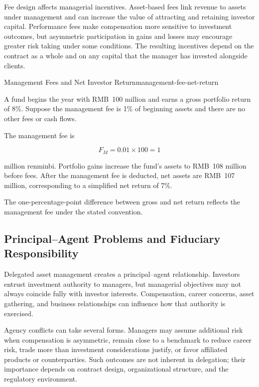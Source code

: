 Fee design affects managerial incentives. Asset-based fees link revenue to assets under management and can increase the value of attracting and retaining investor capital. Performance fees make compensation more sensitive to investment outcomes, but asymmetric participation in gains and losses may encourage greater risk taking under some conditions. The resulting incentives depend on the contract as a whole and on any capital that the manager has invested alongside clients.

\begin{example}{Management Fees and Net Investor Return}{management-fee-net-return}

A fund begins the year with RMB~100 million and earns a gross portfolio return of 8\%. Suppose the management fee is 1\% of beginning assets and there are no other fees or cash flows.

The management fee is

\[
F_M=0.01\times100=1
\]

million renminbi. Portfolio gains increase the fund's assets to RMB~108 million before fees. After the management fee is deducted, net assets are RMB~107 million, corresponding to a simplified net return of 7\%.

The one-percentage-point difference between gross and net return reflects the management fee under the stated convention.

\end{example}

\subsection[Principal--Agent Problems and Fiduciary Responsibility]{Principal--Agent Problems and Fiduciary \\Responsibility}

Delegated asset management creates a principal--agent relationship. Investors entrust investment authority to managers, but managerial objectives may not always coincide fully with investor interests. Compensation, career concerns, asset gathering, and business relationships can influence how that authority is exercised.

Agency conflicts can take several forms. Managers may assume additional risk when compensation is asymmetric, remain close to a benchmark to reduce career risk, trade more than investment considerations justify, or favor affiliated products or counterparties. Such outcomes are not inherent in delegation; their importance depends on contract design, organizational structure, and the regulatory environment.

